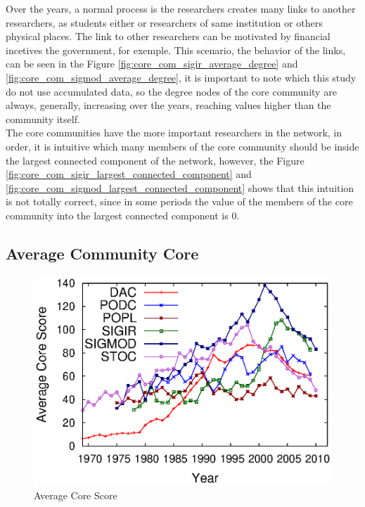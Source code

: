 Over the years, a normal process is the researchers creates many links to another researchers, as students either or researchers of same 
institution or others physical places. The link to other researchers can be motivated by financial incetives the government, for exemple.
This scenario, the behavior of the links, can be seen in the Figure \ref{fig:core_com_sigir_average_degree} and 
\ref{fig:core_com_sigmod_average_degree}, it is important to note which this study do not use accumulated data, so the degree nodes of
the core community are always, generally, increasing over the years, reaching values higher than the community itself.\\
The core communities have the more important researchers in the network, in order, it is intuitive which many members of the core community
should be inside the largest connected component of the network, however, the Figure \ref{fig:core_com_sigir_largest_connected_component} and 
\ref{fig:core_com_sigmod_largest_connected_component} shows that this intuition is not totally correct, since in some periods the value of the
members of the core community into the largest connected component is 0.



\subsection{Average Community Core}

\begin{figure}[!htb]
\centering
\includegraphics[scale=.5]{graficos/average_core_score/average_core_score_slide_window_grupo_temporal_web.eps}
\caption{Average Core Score}
\label{fig:average_core_score}
\end{figure}

